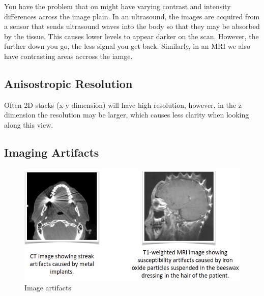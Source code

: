 \documentclass[11pt]{article}
\begin{document}
You have the problem that ou might have varying contrast and intensity differences across the image plain. In an ultrasound, the images are acquired from a sensor that sends ultrasound waves into the body so that they may be absorbed by the tissue. This causes lower levels to appear darker on the scan. However, the further down you go, the less signal you get back. Similarly, in an MRI we also have contrasting areas accross the iamge.

\subsection{Anisostropic Resolution}

Often 2D stacks (x-y dimension) will have high resolution, however, in the z dimension the resolution may be larger, which causes less clarity when looking along this view.

\begin{figure}[H]
    \centering
\end{figure}

\subsection{Imaging Artifacts}

\begin{figure}[H]
    \centering
    \includegraphics[width=.4\linewidth]{figures/image-artifact.png}
    \caption{Image artifacts}
\end{figure}
\end{document}
